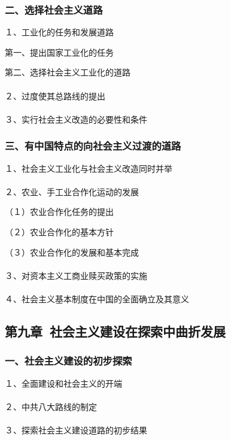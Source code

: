 \documentclass{ctexart}
\begin{document}
\subsubsection{二、选择社会主义道路}
１、工业化的任务和发展道路

第一、提出国家工业化的任务

第二、选择社会主义工业化的道路
\\\\

２、过度使其总路线的提出
\\\\

３、实行社会主义改造的必要性和条件

\subsubsection{三、有中国特点的向社会主义过渡的道路}

１、社会主义工业化与社会主义改造同时并举
\\\\

２、农业、手工业合作化运动的发展

（１）农业合作化任务的提出

（２）农业合作化的基本方针

（３）农业合作化的发展和基本完成
\\\\

３、对资本主义工商业赎买政策的实施
\\\\

４、社会主义基本制度在中国的全面确立及其意义



\subsection{第九章\ 社会主义建设在探索中曲折发展}

\subsubsection{一、社会主义建设的初步探索}

１、全面建设和社会主义的开端
\\\\

２、中共八大路线的制定
\\\\

３、探索社会主义建设道路的初步结果
\end{document}
